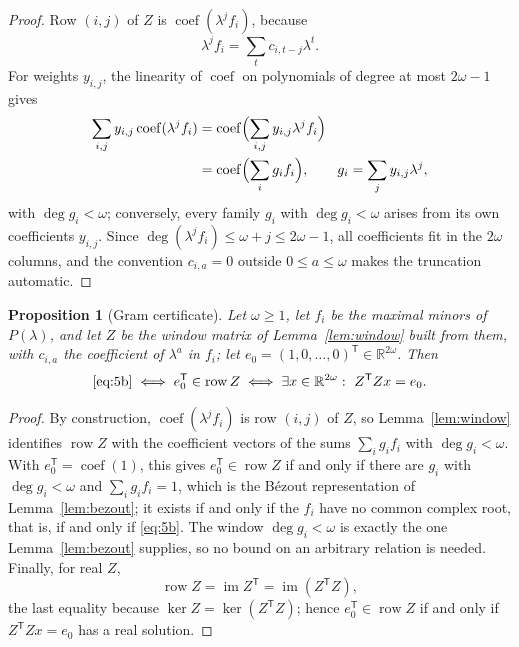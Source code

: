 \documentclass[journal]{IEEEtran}
\theoremstyle{plainn}
\newtheorem{prop}[thm]{Proposition}
\theoremstyle{remark}
\begin{document}
\begin{proof}
	Row $(i,j)$ of $Z$ is $\operatorname{coef}(\lambda^jf_i)$, because
	\[
	\lambda^jf_i=\sum_t c_{i,t-j}\lambda^t .
	\]
	For weights $y_{i,j}$, the linearity of $\operatorname{coef}$ on
	polynomials of degree at most $2\omega-1$ gives
	\[
	\begin{aligned}
	\sum_{i,j}y_{i,j}\operatorname{coef}(\lambda^jf_i)
	&=\operatorname{coef}\Bigl(\sum_{i,j}y_{i,j}\lambda^jf_i\Bigr)\\
	&=\operatorname{coef}\Bigl(\sum_i g_if_i\Bigr),
	\qquad g_i=\sum_j y_{i,j}\lambda^j,
	\end{aligned}
	\]
	with $\deg g_i<\omega$; conversely, every family $g_i$ with
	$\deg g_i<\omega$ arises from its own coefficients $y_{i,j}$. Since
	$\deg(\lambda^jf_i)\le\omega+j\le2\omega-1$, all coefficients fit in
	the $2\omega$ columns, and the convention $c_{i,a}=0$ outside
	$0\le a\le\omega$ makes the truncation automatic.
\end{proof}

\begin{prop}[Gram certificate]\label{prop:gram}\label{sec:gram}
	Let $\omega\ge1$, let $f_i$ be the maximal minors of $P(\lambda)$, and let $Z$ be the window
	matrix of Lemma~\ref{lem:window} built from them, with $c_{i,a}$ the coefficient of $\lambda^a$
	in $f_i$; let $e_0=(1,0,\ldots,0)^{\mathsf T}\in\mathbb R^{2\omega}$. Then
	\[
	\eqref{eq:5b}
	\iff e_0^{\mathsf T}\in\operatorname{row}Z
	\iff\exists x\in\mathbb R^{2\omega}:\ Z^{\mathsf T}Zx=e_0 .
	\]
\end{prop}

\begin{proof}
	By construction, $\operatorname{coef}(\lambda^jf_i)$ is row $(i,j)$ of $Z$, so
	Lemma~\ref{lem:window} identifies $\operatorname{row}Z$ with the coefficient vectors of the sums
	$\sum_i g_if_i$ with $\deg g_i<\omega$. With $e_0^{\mathsf T}=\operatorname{coef}(1)$, this gives
	$e_0^{\mathsf T}\in\operatorname{row}Z$ if and only if there are $g_i$ with $\deg g_i<\omega$ and
	$\sum_i g_if_i=1$, which is the B\'ezout representation of Lemma~\ref{lem:bezout}; it exists if
	and only if the $f_i$ have no common complex root, that is, if and only if \eqref{eq:5b}. The
	window $\deg g_i<\omega$ is exactly the one Lemma~\ref{lem:bezout} supplies, so no bound on an
	arbitrary relation is needed. Finally, for real $Z$,
	\[
	\operatorname{row}Z=\operatorname{im}Z^{\mathsf T}
	=\operatorname{im}(Z^{\mathsf T}Z),
	\]
	the last equality because $\ker Z=\ker(Z^{\mathsf T}Z)$; hence
	$e_0^{\mathsf T}\in\operatorname{row}Z$ if and only if
	$Z^{\mathsf T}Zx=e_0$ has a real solution.
\end{proof}
\end{document}
